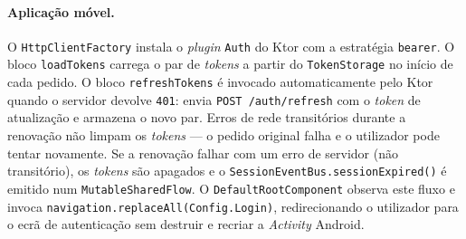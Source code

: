 \paragraph{Aplicação móvel.}
O \texttt{HttpClientFactory} instala o \textit{plugin} \texttt{Auth} do
Ktor com a estratégia \texttt{bearer}.
O bloco \texttt{loadTokens} carrega o par de \textit{tokens} a partir do
\texttt{TokenStorage} no início de cada pedido.
O bloco \texttt{refreshTokens} é invocado automaticamente pelo Ktor quando
o servidor devolve \texttt{401}: envia \texttt{POST /auth/refresh} com o
\textit{token} de atualização e armazena o novo par.
Erros de rede transitórios durante a renovação não limpam os \textit{tokens}
— o pedido original falha e o utilizador pode tentar novamente.
Se a renovação falhar com um erro de servidor (não transitório), os
\textit{tokens} são apagados e o \texttt{SessionEventBus.sessionExpired()}
é emitido num \texttt{MutableSharedFlow}.
O \texttt{DefaultRootComponent} observa este fluxo e invoca
\texttt{navigation.replaceAll(Config.Login)}, redirecionando o utilizador
para o ecrã de autenticação sem destruir e recriar a \textit{Activity}
Android.

